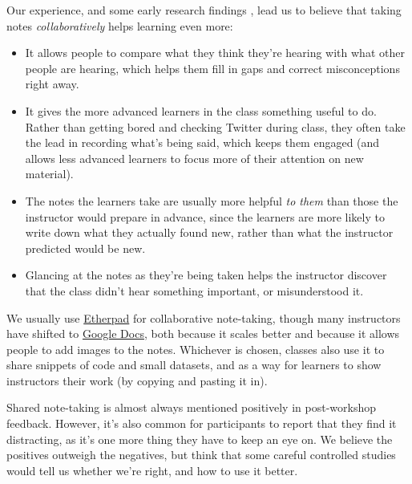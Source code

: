 Our experience, and some early research findings \cite{fixme}, lead us
to believe that taking notes \emph{collaboratively} helps learning
even more:

\begin{itemize}

\item
  It allows people to compare what they think they're hearing with
  what other people are hearing, which helps them fill in gaps and
  correct misconceptions right away.

\item
  It gives the more advanced learners in the class something useful to
  do.  Rather than getting bored and checking Twitter during class,
  they often take the lead in recording what's being said, which keeps
  them engaged (and allows less advanced learners to focus more of
  their attention on new material).

\item
  The notes the learners take are usually more helpful \emph{to them}
  than those the instructor would prepare in advance, since the learners
  are more likely to write down what they actually found new, rather than
  what the instructor predicted would be new.

\item
  Glancing at the notes as they're being taken helps the instructor
  discover that the class didn't hear something important, or
  misunderstood it.

\end{itemize}

We usually use \href{http://etherpad.org}{Etherpad} for collaborative
note-taking, though many instructors have shifted to
\href{https://docs.google.com}{Google Docs}, both because it scales
better and because it allows people to add images to the notes.
Whichever is chosen, classes also use it to share snippets of code and
small datasets, and as a way for learners to show instructors their
work (by copying and pasting it in).

Shared note-taking is almost always mentioned positively in
post-workshop feedback.  However, it's also common for participants to
report that they find it distracting, as it's one more thing they have
to keep an eye on.  We believe the positives outweigh the negatives,
but think that some careful controlled studies would tell us whether
we're right, and how to use it better.


